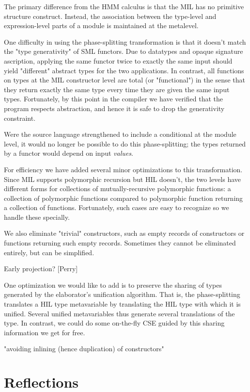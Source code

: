 \documentclass[twoside]{article}
\begin{document}
The primary difference from the HMM calculus is that the MIL
has no primitive structure construct.  Instead, the association
between the type-level and expression-level parts of a module
is maintained at the metalevel.

One difficulty in using the phase-splitting transformation is
that it doesn't match the "type generativity" of SML functors.
Due to datatypes and opaque signature ascription, applying the
same functor twice to exactly the same input should yield
"different" abstract types for the two applications.  In contrast,
all functions on types at the MIL constructor level are total
(or "functional") in the sense that they return exactly
the same type every time they are given the same input types.
Fortunately, by this point in the compiler we have verified
that the program respects abstraction, and hence it is safe
to drop the generativity constraint.

Were the source language strengthened to include a conditional at the
module level, it would no longer be possible to do this
phase-splitting; the types returned by a functor would depend on input
\emph{values}.

For efficiency we have added several minor optimizations to this
transformation.  Since MIL supports polymorphic recursion but
HIL doesn't, the two levels have different forms for collections of 
mutually-recursive polymorphic functions:  a collection of polymorphic
functions compared to polymorphic function returning a collection
of functions.  Fortunately, such cases are easy to recognize so we
handle these specially.

We also eliminate "trivial" constructors, such as empty records of
constructors or functions returning such empty records.  Sometimes
they cannot be eliminated entirely, but can be simplified.  

Early projection? [Perry]

One optimization we would like to add is to preserve the
sharing of types generated by the elaborator's unification
algorithm.  That is, the phase-splitting translates a 
HIL type metavariable by translating the HIL type
with which it is unified.  Several unified
metavariables thus generate several translations of the type.
In contrast, we could do some on-the-fly CSE guided by
this sharing information we get for free.



"avoiding inlining (hence duplication) of constructors" 

\section{Reflections}
\end{document}
